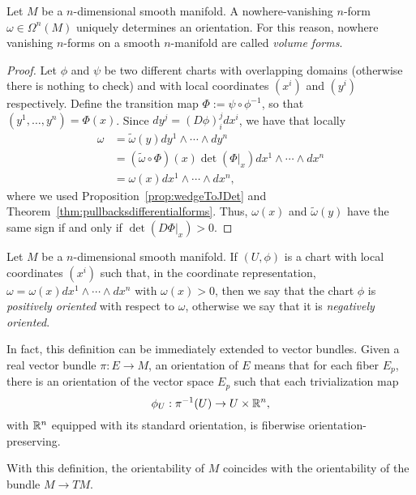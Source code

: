 \begin{theorem}
  Let $M$ be a $n$-dimensional smooth manifold.
  A nowhere-vanishing $n$-form $\omega\in\Omega^n(M)$ uniquely determines an orientation.
  For this reason, nowhere vanishing $n$-forms on a smooth $n$-manifold are called \emph{volume forms}.
\end{theorem}
\begin{proof}
  Let $\phi$ and $\psi$ be two different charts with overlapping domains (otherwise there is nothing to check) and with local coordinates $(x^i)$ and $(y^i)$ respectively.
  Define the transition map $\Phi := \psi\circ\phi^{-1}$, so that $(y^1,\ldots,y^n) = \Phi(x)$.
  Since $d y^j = (D\phi)_i^j dx^i$, we have that locally
  \begin{align}
    \omega &= \widetilde \omega (y) dy^1\wedge\cdots\wedge dy^n \\
    &= (\widetilde\omega \circ \Phi)(x) \det(\Phi|_x) dx^{1}\wedge\cdots\wedge dx^{n} \\
    &= \omega(x) dx^{1}\wedge\cdots\wedge dx^{n},
  \end{align}
  where we used Proposition~\ref{prop:wedgeToJDet} and Theorem~\ref{thm:pullbacksdifferentialforms}.
  Thus, $\omega(x)$ and $\widetilde\omega(y)$ have the same sign if and only if $\det(D\Phi|_x) > 0$.
\end{proof}

\begin{definition}
  Let $M$ be a $n$-dimensional smooth manifold.
  If $(U,\phi)$ is a chart with local coordinates $(x^i)$ such that, in the coordinate representation, $\omega = \omega(x) dx^1\wedge\cdots\wedge dx^n$ with $\omega(x) > 0$, then we say that the chart $\phi$ is \emph{positively oriented} with respect to $\omega$, otherwise we say that it is \emph{negatively oriented}.  
\end{definition}

\begin{remark}
  In fact, this definition can be immediately extended to vector bundles.
  Given a real vector bundle $\pi: E \to M$, an orientation of $E$ means that for each fiber $E_p$, there is an orientation of the vector space $E_p$ such that each trivialization map
  \begin{equation}
    \phi_{U}:\pi^{-1}(U)\to U\times \mathbb{R}^{n},
  \end{equation}
  with $\mathbb{R}^n$ equipped with its standard orientation, is fiberwise orientation-preserving.

  With this definition, the orientability of $M$ coincides with the orientability of the bundle $M\to TM$.
\end{remark}

